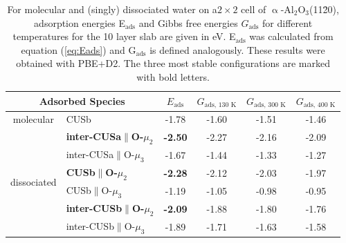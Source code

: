 \documentclass[11pt,DIV=13,BCOR=5mm,a4paper,headinclude]{scrbook}
\begin{document}
\begin{table}[!ht]
  \centering
 \caption{For molecular and (singly) dissociated water on a$2\times 2$ cell of $\upalpha$-Al$_2$O$_3$(11\=20), adsorption energies E$_\textrm{ads}$ and Gibbs free energies $G_\textrm{ads}$ for different temperatures for the 10 layer slab are given in eV.
E$_\textrm{ads}$ was calculated from equation (\ref{eq:Eads}) and G$_\textrm{ads}$ is defined analogously.
These results were obtained with PBE+D2.
The three most stable configurations are marked with bold letters.
\vspace*{.2cm} 
  }
  \begin{tabular}{cl|cccc}
  \toprule
   \multicolumn{2}{c|}{Adsorbed Species}  & $E_\textrm{ads}$ & $G_\text{ads, 130 K}$  &  $G_\text{ads, 300 K}$  & $G_\text{ads, 400 K}$ \\\midrule
\multirow{1}{*}{molecular} & CUSb          &   -1.78  &-1.60 & -1.51  & -1.46 \\\hline
 \multirow{6}{*}{dissociated} & \textbf{inter-CUSa$\parallel$O-$\mu_2$} & \textbf{-2.50} &-2.27 & -2.16 & -2.09 \\
  & inter-CUSa$\parallel$O-$\mu_3$ & -1.67 &-1.44 &-1.33 & -1.27 \\
  & \textbf{CUSb$\parallel$O-$\mu_2$} & \textbf{-2.28} & -2.12& -2.03 &-1.97  \\
 & CUSb$\parallel$O-$\mu_3$ & -1.19 &-1.05 &-0.98 & -0.95 \\%
 & \textbf{inter-CUSb$\parallel$O-$\mu_2$} & \textbf{-2.09} &-1.88 &-1.80 & -1.76 \\
 & inter-CUSb$\parallel$O-$\mu_3$ & -1.89 &-1.71 & -1.63 & -1.58 \\\bottomrule
  \end{tabular}
  \label{tab:ads_1water}
\end{table}
\end{document}
